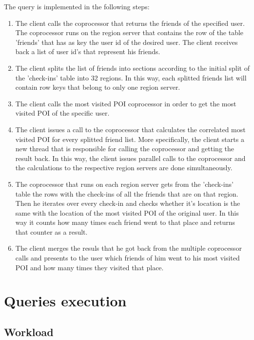 The query is implemented in the following steps:

\begin{enumerate}
 \item The client calls the coprocessor that returns the friends of the specified user. The coprocessor runs on the region server that contains 
 the row of the table 'friends' that has as key the user id of the desired user. The client receives back a list of user id's that 
 represent his friends.
 \item The client splits the list of friends into sections according to the initial split of the 'check-ins' table into 32 regions. In this way, 
 each splitted friends list will contain row keys that belong to only one region server.
 \item The client calls the most visited POI coprocessor in order to get the most visited POI of the specific user.
 \item The client issues a call to the coprocessor that calculates the correlated most visited POI for every splitted friend list. 
 More specifically, the client starts a new thread that is responsible for calling the coprocessor and getting the result back. 
 In this way, the client issues parallel calls to the coprocessor and the calculations to the respective region servers are done simultaneously.
 \item The coprocessor that runs on each region server gets from the 'check-ins' table the rows with the check-ins of all the friends that are 
 on that region. Then he iterates over every check-in and checks whether it's location is the same with the location of the most visited POI 
 of the original user. In this way it counts how many times each friend went to that place and returns that counter as a result.
 \item The client merges the resuls that he got back from the multiple coprocessor calls and presents to the user which friends of him went 
 to his most visited POI and how many times they visited that place.
 \end{enumerate}

\section{Queries execution}

\subsection{Workload}

